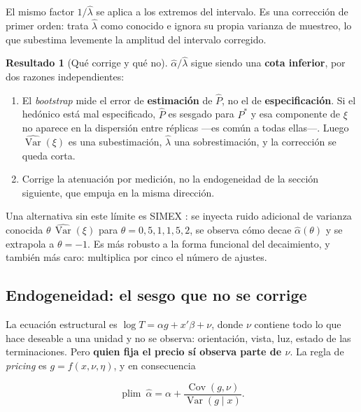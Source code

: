 \documentclass[11pt,a4paper]{article}
\theoremstyle{definition}
\newtheorem{resultado}{Resultado}
\newcommand{\Var}{\operatorname{Var}}
\newcommand{\Cov}{\operatorname{Cov}}
\newcommand{\plim}{\operatorname*{plim}}
\begin{document}
El mismo factor $1/\hat{\lambda}$ se aplica a los extremos del intervalo. Es una
corrección de primer orden: trata $\hat{\lambda}$ como conocido e ignora su propia
varianza de muestreo, lo que subestima levemente la amplitud del intervalo
corregido.

\begin{resultado}[Qué corrige y qué no]
$\hat{\alpha}/\hat{\lambda}$ sigue siendo una \textbf{cota inferior}, por dos razones
independientes:

\begin{enumerate}[leftmargin=1.6em,itemsep=2pt]
\item El \emph{bootstrap} mide el error de \textbf{estimación} de $\hat{P}$, no el de
\textbf{especificación}. Si el hedónico está mal especificado, $\hat{P}$ es sesgado
para $P^{*}$ y esa componente de $\xi$ no aparece en la dispersión entre réplicas
---es común a todas ellas---. Luego $\widehat{\Var}(\xi)$ es una subestimación,
$\hat{\lambda}$ una sobrestimación, y la corrección se queda corta.
\item Corrige la atenuación por medición, no la endogeneidad de la sección
siguiente, que empuja en la misma dirección.
\end{enumerate}
\end{resultado}

Una alternativa sin este límite es SIMEX \cite{cookstefanski1994}: se inyecta ruido
adicional de varianza conocida $\theta\,\widehat{\Var}(\xi)$ para $\theta=0{,}5,1,1{,}5,2$,
se observa cómo decae $\hat{\alpha}(\theta)$ y se extrapola a $\theta=-1$. Es más
robusto a la forma funcional del decaimiento, y también más caro: multiplica por
cinco el número de ajustes.

\subsection{Endogeneidad: el sesgo que no se corrige}

La ecuación estructural es $\log T=\alpha g+x'\beta+\nu$, donde $\nu$ contiene
todo lo que hace deseable a una unidad y no se observa: orientación, vista, luz,
estado de las terminaciones. Pero \textbf{quien fija el precio sí observa parte
de $\nu$}. La regla de \emph{pricing} es $g=f(x,\nu,\eta)$, y en consecuencia

\begin{equation}
\plim\ \hat{\alpha}=\alpha+\frac{\Cov(g,\nu)}{\Var(g\mid x)} .
\label{eq:endogeneidad}
\end{equation}
\end{document}
